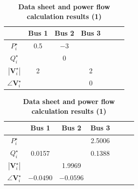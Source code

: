 \documentclass[graybox, envcountchap]{svmult}
\begin{document}
\begin{table}[h]
\medskip
\caption{\textbf{Data sheet and power flow calculation results (1)}} \label{table:pflow1}
 \centering
  {
  \begin{minipage}{0.49\linewidth}
    \centering
  \begin{tabular}{|c|c|c|c|c|c|c|}
   \hline
 & Bus 1 & Bus 2 & Bus 3 \\
   \hline 
   $P_i^{\star}$ & 0.5 & $-3$ & \\
   \hline
   $Q_i^{\star}$ &  & 0 & \\
   \hline
   $|\bm{V}_i^{\star}|$ & 2 & & 2 \\
   \hline
   $\angle \bm{V}_i^{\star}$ & & & 0 \\
   \hline
  \end{tabular}
  \end{minipage}
  \begin{minipage}{0.49\linewidth}
    \centering
  \begin{tabular}{|c|c|c|c|c|c|c|}
   \hline
 & Bus 1 & Bus 2 & Bus 3 \\
   \hline 
   $P_i^{\star}$ & & & 2.5006 \\
   \hline
   $Q_i^{\star}$ & 0.0157 & & 0.1388 \\
   \hline
   $|\bm{V}_i^{\star}|$ & & 1.9969 & \\
   \hline
   $\angle \bm{V}_i^{\star}$ & $-0.0490$ & $-0.0596$ & \\
   \hline
  \end{tabular}
  \end{minipage}
  }
\end{table}
\end{document}
